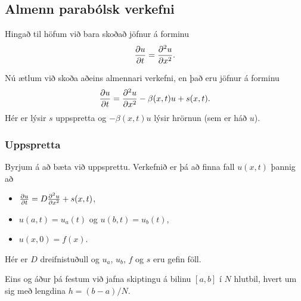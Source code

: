 \documentclass[icelandic,a4paper,12pt]{article}
\begin{document}
  
  
\subsection{Almenn parabólsk verkefni}
   Hingað til höfum við bara skoðað jöfnur á forminu
   $$
    \frac{{\partial} u}{{\partial} t} = \frac{{\partial}^2 u}{{\partial} x^2}.
   $$
   \pause
   
Nú ætlum við skoða aðeins almennari verkefni, en það eru jöfnur á forminu 
   $$
    \frac{{\partial} u}{{\partial} t} = \frac{{\partial}^2 u}{{\partial} x^2} -\beta(x,t)u + s(x,t).
   $$
   \pause
Hér er lýsir $s$ uppspretta og $-\beta(x,t)u$ lýsir hrörnun (sem er háð $u$). 
  

\subsubsection{Uppspretta}
   Byrjum á að bæta við uppsprettu. \pause
   Verkefnið er þá að finna fall $u(x,t)$ þannig að 
   \begin{itemize}
 \item $\frac{{\partial} u}{{\partial} t} =  D \frac{{\partial}^2 u}{{\partial} x^2} + s(x,t)$,
 \item $u(a,t) = u_a(t)$ og $u(b,t) = u_b(t)$, 
 \item $u(x,0) = f(x)$.
\end{itemize}
Hér er $D$ dreifnistuðull og $u_a$, $u_b$, $f$ og $s$ eru gefin
föll.

Eins og áður þá festum við jafna skiptingu á bilinu $[a,b]$ í $N$ hlutbil,
hvert um sig með lengdina $h = (b-a)/N$.
\end{document}
